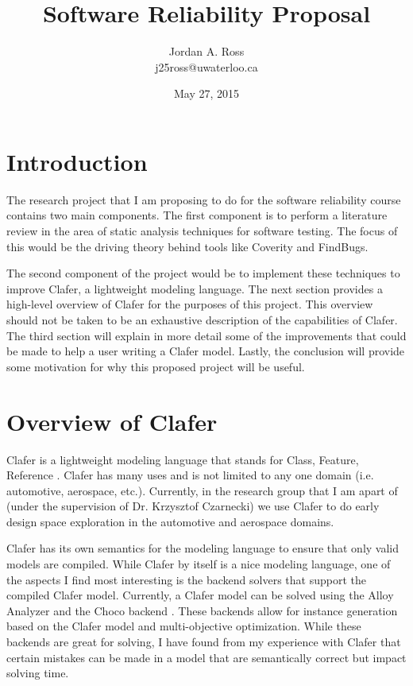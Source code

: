 \documentclass{article}
\title{Software Reliability Proposal}
\author{Jordan A. Ross \\j25ross@uwaterloo.ca}
\date{May 27, 2015}
\begin{document}
\maketitle

\section{Introduction}
The research project that I am proposing to do for the software reliability course contains two main components. The first component is to perform a literature review in the area of static analysis techniques for software testing. The focus of this would be the driving theory behind tools like Coverity\textsuperscript{\textregistered} and FindBugs\texttrademark.

The second component of the project would be to implement these techniques to improve Clafer, a lightweight modeling language. The next section provides a high-level overview of Clafer for the purposes of this project. This overview should not be taken to be an exhaustive description of the capabilities of Clafer. The third section will explain in more detail some of the improvements that could be made to help a user writing a Clafer model. Lastly, the conclusion will provide some motivation for why this proposed project will be useful.

\section{Overview of Clafer}
Clafer is a lightweight modeling language that stands for Class, Feature, Reference \cite{600}. Clafer has many uses and is not limited to any one domain (i.e. automotive, aerospace, etc.). Currently, in the research group that I am apart of (under the supervision of Dr. Krzysztof Czarnecki) we use Clafer to do early design space exploration in the automotive and aerospace domains. 

Clafer has its own semantics for the modeling language \cite{601} to ensure that only valid models are compiled. While Clafer by itself is a nice modeling language, one of the aspects I find most interesting is the backend solvers that support the compiled Clafer model. Currently, a Clafer model can be solved using the Alloy Analyzer and the Choco backend \cite{602, 603}. These backends allow for instance generation based on the Clafer model and multi-objective optimization. While these backends are great for solving, I have found from my experience with Clafer that certain mistakes can be made in a model that are semantically correct but impact solving time.
\end{document}
